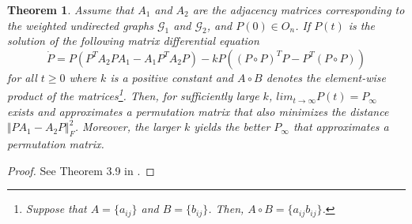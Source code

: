 \documentclass[11pt, a4paper, oneside, openany, reqno]{book}
\newtheorem{theorem}{Theorem}[chapter]
\theoremstyle{definition}
\theoremstyle{remark}
\numberwithin{equation}{chapter} %
\newcommand{\GRP}{\mathcal{G}}
\begin{document}
\begin{theorem}\label{pdynamicsthm}
	Assume that $ A_1 $ and $ A_2 $ are the adjacency matrices
	corresponding to the weighted undirected graphs $ \GRP_1 $ and $ \GRP_2 $, and $ P(0) \in O_n $.
	If $ P(t) $ is the solution of the following matrix differential equation
	\begin{equation}\label{pdynamics}
		\dot{P} = P \left( P^T A_2 P A_1 - A_1 P^T A_2 P \right)
					-k P \left( (P \circ P)^T P -P^T (P \circ P) \right)
	\end{equation}
	for all $ t \geq 0 $ where $ k $ is a positive constant
	and $ A \circ  B $ denotes the element-wise product of the matrices\footnote
	{Suppose that $ A=\lbrace a_{ij} \rbrace $ and $ B=\lbrace b_{ij} \rbrace $.
	Then, $ A \circ  B = \lbrace a_{ij}b_{ij} \rbrace$.}.	
	Then, for sufficiently large $ k $,
	$ lim_{t \to \infty}P(t) = P_\infty $ exists and
	approximates a permutation matrix that also minimizes the distance
	$ \Vert PA_1 - A_2 P \Vert_F^2 $.
	Moreover, the larger $ k $ yields the better $ P_\infty $ that approximates a permutation matrix.
\end{theorem}

\begin{proof}
	See Theorem 3.9 in \cite{graphmatch}.
\end{proof}
\end{document}
